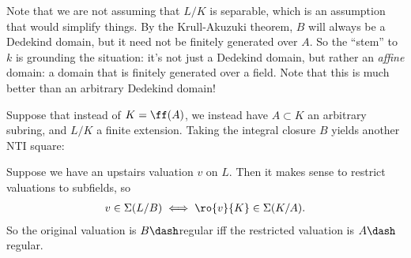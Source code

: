 \begin{remark}

Note that we are not assuming that \(L/K\) is separable, which is an
assumption that would simplify things. By the Krull-Akuzuki theorem,
\(B\) will always be a Dedekind domain, but it need not be finitely
generated over \(A\). So the ``stem'' to \(k\) is grounding the
situation: it's not just a Dedekind domain, but rather an \emph{affine}
domain: a domain that is finitely generated over a field. Note that this
is much better than an arbitrary Dedekind domain!

\end{remark}

\begin{proposition}

Suppose that instead of \(K = \ff(A)\), we instead have \(A \subset K\)
an arbitrary subring, and \(L/K\) a finite extension. Taking the
integral closure \(B\) yields another NTI square:

\begin{center}\end{center}

Suppose we have an upstairs valuation \(v\) on \(L\). Then it makes
sense to restrict valuations to subfields, so
\begin{align*}  
v\in \Sigma(L/B) \iff \ro{v}{K} \in \Sigma(K/A)
.\end{align*} So the original valuation is \(B\dash\)regular iff the
restricted valuation is \(A\dash\)regular.

\end{proposition}

